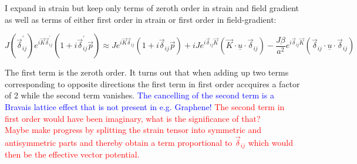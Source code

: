 \documentclass[../../../main.tex]{subfiles}
\begin{document}
I expand in strain but keep only terms of zeroth order in strain and field gradient as well as terms of either first order in strain or first order in field-gradient:


\begin{equation}
	J(\vec{\delta}_{ij}^\prime)e^{i\vec{K}\vec{\delta}_{ij}^\prime}(1+i\vec{\delta}_{ij}^\prime\vec{p}) \approx Je^{i\vec{K}\vec{\delta}_{ij}}(1+i\vec{\delta}_{ij}\vec{p}) + iJe^{i\vec{\delta}_{ij}\vec{K}}\left(\vec{K} \cdot \underline{u} \cdot \vec{\delta}_{ij} \right) - \frac{J\beta}{a^2} e^{i\vec{\delta}_{ij}\vec{K}} \left( \vec{\delta}_{ij} \cdot \underline{u} \cdot \vec{\delta}_{ij} \right)
\end{equation}

The first term is the zeroth order. It turns out that when adding up two terms corresponding to opposite directions the first term in first order accquires a factor of 2 while the second term vanishes. \textcolor{blue}{The cancelling of the second term is a Bravais lattice effect that is not present in e.g. Graphene!} \textcolor{red}{The second term in first order would have been imaginary, what is the significance of that?} \\

\textcolor{red}{Maybe make progress by splitting the strain tensor into symmetric and antisymmetric parts and thereby obtain a term proportional to $\vec{\delta}_{ij}$ which would then be the effective vector potential.}
\end{document}
